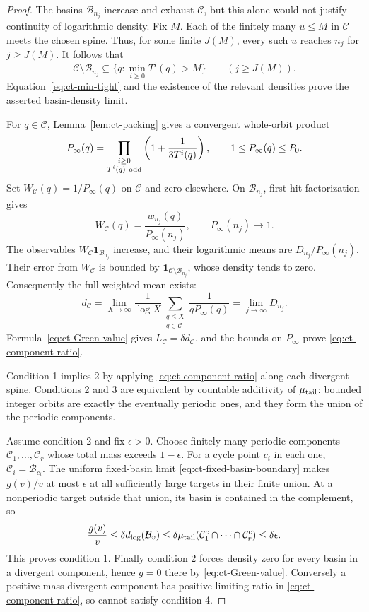 \documentclass[11pt,a4paper]{article}
\begin{document}
\begin{proof}
The basins \(\mathcal B_{n_j}\) increase and exhaust \(\mathcal C\),
but this alone would not justify continuity of logarithmic density.
Fix \(M\). Each of the finitely many \(u\le M\) in \(\mathcal C\)
meets the chosen spine. Thus, for some finite \(J(M)\), every such
\(u\) reaches \(n_j\) for \(j\ge J(M)\). It follows that
\[
 \mathcal C\setminus\mathcal B_{n_j}
       \subseteq\{q:\min_{i\ge0}T^i(q)>M\}
                    \qquad(j\ge J(M)).
\]
Equation~\eqref{eq:ct-min-tight} and the existence of the relevant
densities prove the asserted basin-density limit.

For \(q\in\mathcal C\), Lemma~\ref{lem:ct-packing} gives a
convergent whole-orbit product
\[
 P_\infty(q)=
 \prod_{\substack{i\ge0\\T^i(q)\ {\rm odd}}}
        \left(1+\frac1{3T^i(q)}\right),
 \qquad 1\le P_\infty(q)\le P_0.
\]
Set \(W_{\mathcal C}(q)=1/P_\infty(q)\) on \(\mathcal C\) and
zero elsewhere. On \(\mathcal B_{n_j}\), first-hit factorization
gives
\[
 W_{\mathcal C}(q)=\frac{w_{n_j}(q)}{P_\infty(n_j)},
             \qquad P_\infty(n_j)\longrightarrow1.
\]
The observables
\(W_{\mathcal C}\mathbf1_{\mathcal B_{n_j}}\) increase, and
their logarithmic means are \(D_{n_j}/P_\infty(n_j)\).
Their error from \(W_{\mathcal C}\) is bounded by
\(\mathbf1_{\mathcal C\setminus\mathcal B_{n_j}}\), whose
density tends to zero. Consequently the full weighted mean exists:
\[
 d_{\mathcal C}
 =\lim_{X\to\infty}\frac1{\log X}
       \sum_{\substack{q\le X\\q\in\mathcal C}}
                       \frac1{qP_\infty(q)}
 =\lim_{j\to\infty}D_{n_j}.
\]
Formula~\eqref{eq:ct-Green-value} gives
\(L_{\mathcal C}=\delta d_{\mathcal C}\), and the bounds on
\(P_\infty\) prove \eqref{eq:ct-component-ratio}.

Condition 1 implies 2 by applying
\eqref{eq:ct-component-ratio} along each divergent spine.
Conditions 2 and 3 are equivalent by countable additivity of
\(\mu_{\rm tail}\): bounded integer orbits are exactly the
eventually periodic ones, and they form the union of the periodic
components.

Assume condition 2 and fix \(\epsilon>0\). Choose finitely many
periodic components \(\mathcal C_1,\ldots,\mathcal C_r\) whose
total mass exceeds \(1-\epsilon\). For a cycle point \(c_i\) in
each one, \(\mathcal C_i=\mathcal B_{c_i}\).
The uniform fixed-basin limit
\eqref{eq:ct-fixed-basin-boundary} makes \(g(v)/v\) at most
\(\epsilon\) at all sufficiently large targets in their finite
union. At a nonperiodic target outside that union, its basin is
contained in the complement, so
\[
 \frac{g(v)}v\le\delta d_{\log}(\mathcal B_v)
 \le\delta\mu_{\rm tail}\!\left(
          \mathcal C_1^c\cap\cdots\cap\mathcal C_r^c\right)
 \le\delta\epsilon.
\]
This proves condition 1. Finally condition 2 forces density zero
for every basin in a divergent component, hence \(g=0\) there by
\eqref{eq:ct-Green-value}. Conversely a positive-mass divergent
component has positive limiting ratio in
\eqref{eq:ct-component-ratio}, so cannot satisfy condition 4.
\end{proof}
\end{document}
